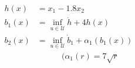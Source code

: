\documentclass[preview]{standalone}
\begin{document}
\begin{align*}
h(x) &= x_1 - 1.8 x_2\\ b_1(x) &= \inf_{u \in \mathcal{U}} \dot h +  4h(x)\\ b_2(x) &= \inf_{u \in \mathcal{U}} \dot b_1 +  \alpha_1(b_1(x))\\ &{}\quad\quad \quad (\alpha_1(r) = 7 \sqrt{r}
\end{align*}
\end{document}
